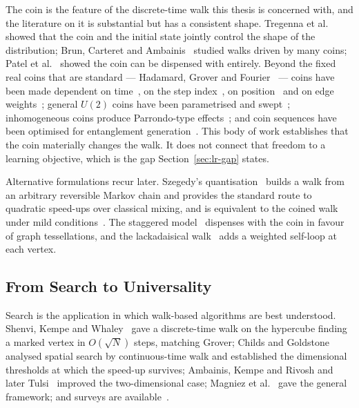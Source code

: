 The coin is the feature of the discrete-time walk this thesis is concerned with,
and the literature on it is substantial but has a consistent shape. Tregenna et
al.~\cite{Tregenna_2003} showed that the coin and the initial state jointly
control the shape of the distribution; Brun, Carteret and
Ambainis~\cite{Brun_2002} studied walks driven by many coins; Patel et
al.~\cite{Patel_2004} showed the coin can be dispensed with entirely. Beyond the
fixed real coins that are standard --- Hadamard, Grover and
Fourier~\cite{Komatsu_2019, Saito_2018} --- coins have been made dependent on
time~\cite{C_2006}, on the step index~\cite{Panahiyan_2018}, on
position~\cite{Ahmad_2020} and on edge weights~\cite{Wong_2017}; general $U(2)$
coins have been parametrised and swept~\cite{Li_2012, Souza_2013, Naves_2023};
inhomogeneous coins produce Parrondo-type
effects~\cite{Mittal_2024, Kadiri_2024}; and coin sequences have been optimised
for entanglement generation~\cite{Gratsea_2020}. This body of work establishes
that the coin materially changes the walk. It does not connect that freedom to a
learning objective, which is the gap Section~\ref{sec:lr-gap} states.

Alternative formulations recur later. Szegedy's quantisation~\cite{Szegedy}
builds a walk from an arbitrary reversible Markov chain and provides the
standard route to quadratic speed-ups over classical mixing, and is equivalent
to the coined walk under mild conditions~\cite{G_2017}. The staggered
model~\cite{Portugal_2016} dispenses with the coin in favour of graph
tessellations, and the lackadaisical walk~\cite{G_2018} adds a weighted
self-loop at each vertex.

\subsection{From Search to Universality}
Search is the application in which walk-based algorithms are best understood.
Shenvi, Kempe and Whaley~\cite{Shenvi_2002} gave a discrete-time walk on the
hypercube finding a marked vertex in $O(\sqrt{N})$ steps, matching Grover;
Childs and Goldstone~\cite{Childs_2003, Childs_2004} analysed spatial search by
continuous-time walk and established the dimensional thresholds at which the
speed-up survives; Ambainis, Kempe and Rivosh and later
Tulsi~\cite{Ambainis_2004, Tulsi_2008} improved the two-dimensional case;
Magniez et al.~\cite{Magniez_2007} gave the general framework; and surveys are
available~\cite{santha2008quantum}.


